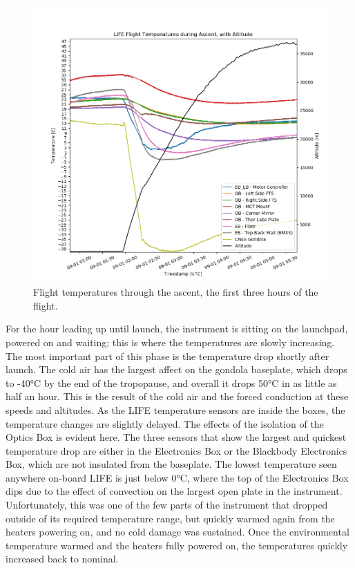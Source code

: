 \begin{figure}
    \centering
    \includegraphics[width=\textwidth]{chap4_images/ascent_images/ascent_no_sim_temps.png}
    \caption{Flight temperatures through the ascent, the first three hours of the flight.}
    \label{fig:ascent_temps_no_sims}
\end{figure}

For the hour leading up until launch, the instrument is sitting on the launchpad, powered on and waiting; this is where the temperatures are slowly increasing. The most important part of this phase is the temperature drop shortly after launch. The cold air has the largest affect on the gondola baseplate, which drops to -40°C by the end of the tropopause, and overall it drops 50°C in as little as half an hour. This is the result of the cold air and the forced conduction at these speeds and altitudes. As the LIFE temperature sensors are inside the boxes, the temperature changes are slightly delayed. The effects of the isolation of the Optics Box is evident here. The three sensors that show the largest and quickest temperature drop are either in the Electronics Box or the Blackbody Electronics Box, which are not insulated from the baseplate. The lowest temperature seen anywhere on-board LIFE is just below 0°C, where the top of the Electronics Box dips due to the effect of convection on the largest open plate in the instrument. Unfortunately, this was one of the few parts of the instrument that dropped outside of its required temperature range, but quickly warmed again from the heaters powering on, and no cold damage was sustained. Once the environmental temperature warmed and the heaters fully powered on, the temperatures quickly increased back to nominal.

